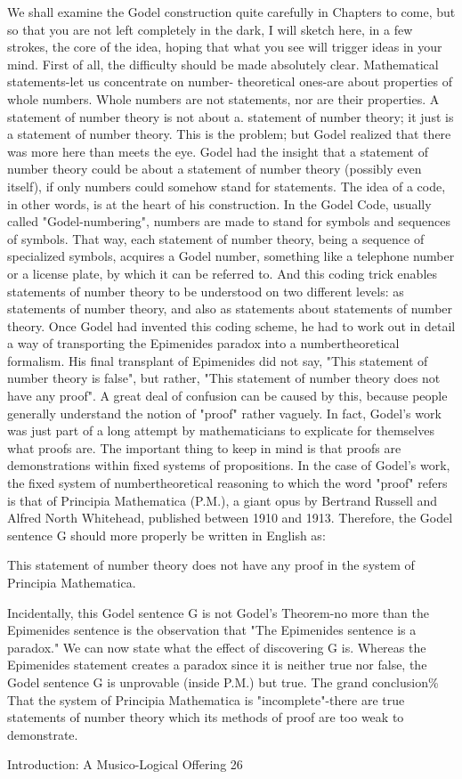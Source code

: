 We shall examine the Godel construction quite carefully in Chapters to come, but so that
you are not left completely in the dark, I will sketch here, in a few strokes, the core of the
idea, hoping that what you see will trigger ideas in your mind. First of all, the difficulty
should be made absolutely clear. Mathematical statements-let us concentrate on number-
theoretical ones-are about properties of whole numbers. Whole numbers are not
statements, nor are their properties. A statement of number theory is not about a.
statement of number theory; it just is a statement of number theory. This is the problem;
but Godel realized that there was more here than meets the eye.
  Godel had the insight that a statement of number theory could be about a statement of
number theory (possibly even itself), if only numbers could somehow stand for
statements. The idea of a code, in other words, is at the heart of his construction. In the
Godel Code, usually called "Godel-numbering", numbers are made to stand for symbols
and sequences of symbols. That way, each statement of number theory, being a sequence
of specialized symbols, acquires a Godel number, something like a telephone number or a
license plate, by which it can be referred to. And this coding trick enables statements of
number theory to be understood on two different levels: as statements of number theory,
and also as statements about statements of number theory.
  Once Godel had invented this coding scheme, he had to work out in detail a way of
transporting the Epimenides paradox into a numbertheoretical formalism. His final
transplant of Epimenides did not say, "This statement of number theory is false", but
rather, "This statement of number theory does not have any proof". A great deal of
confusion can be caused by this, because people generally understand the notion of
"proof" rather vaguely. In fact, Godel's work was just part of a long attempt by
mathematicians to explicate for themselves what proofs are. The important thing to keep
in mind is that proofs are demonstrations within fixed systems of propositions. In the case
of Godel's work, the fixed system of numbertheoretical reasoning to which the word
"proof" refers is that of Principia Mathematica (P.M.), a giant opus by Bertrand Russell
and Alfred North Whitehead, published between 1910 and 1913. Therefore, the Godel
sentence G should more properly be written in English as:

      This statement of number theory does not have any proof in the system of Principia
      Mathematica.

Incidentally, this Godel sentence G is not Godel's Theorem-no more than the Epimenides
sentence is the observation that "The Epimenides sentence is a paradox." We can now
state what the effect of discovering G is. Whereas the Epimenides statement creates a
paradox since it is neither true nor false, the Godel sentence G is unprovable (inside
P.M.) but true. The grand conclusion\% That the system of Principia Mathematica is
"incomplete"-there are true statements of number theory which its methods of proof are
too weak to demonstrate.




Introduction: A Musico-Logical Offering                                                    26
